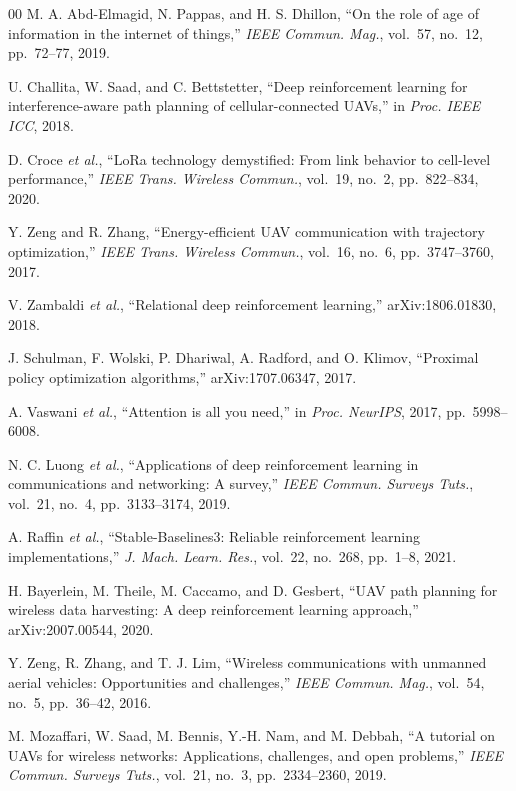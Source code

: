 \documentclass[conference]{IEEEtran}
\begin{document}
\begin{thebibliography}{00}
M. A. Abd-Elmagid, N. Pappas, and H. S. Dhillon,
``On the role of age of information in the internet of things,''
\textit{IEEE Commun. Mag.}, vol.~57, no.~12, pp.~72--77, 2019.

U. Challita, W. Saad, and C. Bettstetter,
``Deep reinforcement learning for interference-aware path planning
of cellular-connected {UAVs},''
in \textit{Proc. IEEE ICC}, 2018.

D. Croce \textit{et al.},
``{LoRa} technology demystified: From link behavior to cell-level performance,''
\textit{IEEE Trans. Wireless Commun.}, vol.~19, no.~2, pp.~822--834, 2020.

Y. Zeng and R. Zhang,
``Energy-efficient {UAV} communication with trajectory optimization,''
\textit{IEEE Trans. Wireless Commun.}, vol.~16, no.~6, pp.~3747--3760, 2017.

V. Zambaldi \textit{et al.},
``Relational deep reinforcement learning,''
arXiv:1806.01830, 2018.

J. Schulman, F. Wolski, P. Dhariwal, A. Radford, and O. Klimov,
``Proximal policy optimization algorithms,''
arXiv:1707.06347, 2017.

A. Vaswani \textit{et al.},
``Attention is all you need,''
in \textit{Proc. NeurIPS}, 2017, pp.~5998--6008.

N. C. Luong \textit{et al.},
``Applications of deep reinforcement learning in communications
and networking: A survey,''
\textit{IEEE Commun. Surveys Tuts.}, vol.~21, no.~4,
pp.~3133--3174, 2019.

A. Raffin \textit{et al.},
``Stable-{Baselines3}: Reliable reinforcement learning implementations,''
\textit{J. Mach. Learn. Res.}, vol.~22, no.~268, pp.~1--8, 2021.

H. Bayerlein, M. Theile, M. Caccamo, and D. Gesbert,
``{UAV} path planning for wireless data harvesting:
A deep reinforcement learning approach,''
arXiv:2007.00544, 2020.

Y. Zeng, R. Zhang, and T. J. Lim,
``Wireless communications with unmanned aerial vehicles:
Opportunities and challenges,''
\textit{IEEE Commun. Mag.}, vol.~54, no.~5, pp.~36--42, 2016.

M. Mozaffari, W. Saad, M. Bennis, Y.-H. Nam, and M. Debbah,
``A tutorial on {UAVs} for wireless networks: Applications,
challenges, and open problems,''
\textit{IEEE Commun. Surveys Tuts.}, vol.~21, no.~3,
pp.~2334--2360, 2019.


\end{thebibliography}
\end{document}
